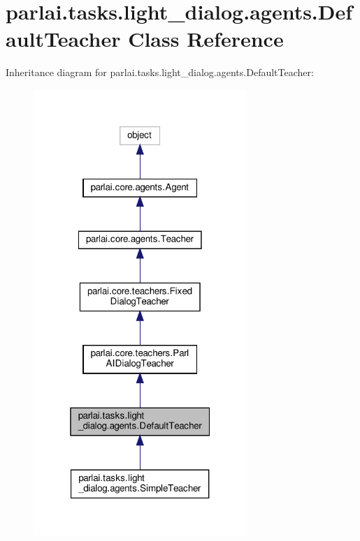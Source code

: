 \hypertarget{classparlai_1_1tasks_1_1light__dialog_1_1agents_1_1DefaultTeacher}{}\section{parlai.\+tasks.\+light\+\_\+dialog.\+agents.\+Default\+Teacher Class Reference}
\label{classparlai_1_1tasks_1_1light__dialog_1_1agents_1_1DefaultTeacher}


Inheritance diagram for parlai.\+tasks.\+light\+\_\+dialog.\+agents.\+Default\+Teacher\+:\nopagebreak
\begin{figure}[H]
\begin{center}
\leavevmode
\includegraphics[width=229pt]{d0/d5f/classparlai_1_1tasks_1_1light__dialog_1_1agents_1_1DefaultTeacher__inherit__graph}
\end{center}
\end{figure}


